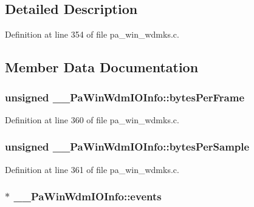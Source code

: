 \subsection{Detailed Description}


Definition at line 354 of file pa\+\_\+win\+\_\+wdmks.\+c.



\subsection{Member Data Documentation}
\subsubsection[{\texorpdfstring{bytes\+Per\+Frame}{bytesPerFrame}}]{\setlength{\rightskip}{0pt plus 5cm}unsigned \+\_\+\+\_\+\+Pa\+Win\+Wdm\+I\+O\+Info\+::bytes\+Per\+Frame}\hypertarget{struct_____pa_win_wdm_i_o_info_ac2141aef40e9aee4a859b91794ec0fc4}{}\label{struct_____pa_win_wdm_i_o_info_ac2141aef40e9aee4a859b91794ec0fc4}


Definition at line 360 of file pa\+\_\+win\+\_\+wdmks.\+c.

\subsubsection[{\texorpdfstring{bytes\+Per\+Sample}{bytesPerSample}}]{\setlength{\rightskip}{0pt plus 5cm}unsigned \+\_\+\+\_\+\+Pa\+Win\+Wdm\+I\+O\+Info\+::bytes\+Per\+Sample}\hypertarget{struct_____pa_win_wdm_i_o_info_af6be7951457618844e4df735a0f64c90}{}\label{struct_____pa_win_wdm_i_o_info_af6be7951457618844e4df735a0f64c90}


Definition at line 361 of file pa\+\_\+win\+\_\+wdmks.\+c.

\subsubsection[{\texorpdfstring{events}{events}}]{$\ast$ \+\_\+\+\_\+\+Pa\+Win\+Wdm\+I\+O\+Info\+::events}\hypertarget{struct_____pa_win_wdm_i_o_info_ad1e42dc04910385e2d5daa31318c5c7d}{}\label{struct_____pa_win_wdm_i_o_info_ad1e42dc04910385e2d5daa31318c5c7d}


